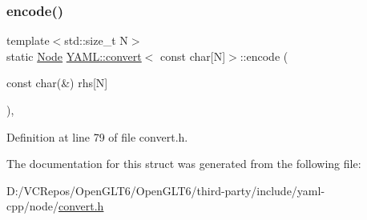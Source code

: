 \subsubsection{\texorpdfstring{encode()}{encode()}}
{\footnotesize\ttfamily template$<$std\+::size\+\_\+t N$>$ \\
static \mbox{\hyperlink{class_y_a_m_l_1_1_node}{Node}} \mbox{\hyperlink{struct_y_a_m_l_1_1convert}{Y\+A\+M\+L\+::convert}}$<$ const char\mbox{[}N\mbox{]}$>$\+::encode (\begin{DoxyParamCaption}\item[{const char(\&)}]{rhs\mbox{[}\+N\mbox{]} }\end{DoxyParamCaption})\hspace{0.3cm}{\ttfamily [inline]}, {\ttfamily [static]}}



Definition at line 79 of file convert.\+h.



The documentation for this struct was generated from the following file\+:\begin{DoxyCompactItemize}
\item 
D\+:/\+V\+C\+Repos/\+Open\+G\+L\+T6/\+Open\+G\+L\+T6/third-\/party/include/yaml-\/cpp/node/\mbox{\hyperlink{convert_8h}{convert.\+h}}\end{DoxyCompactItemize}
